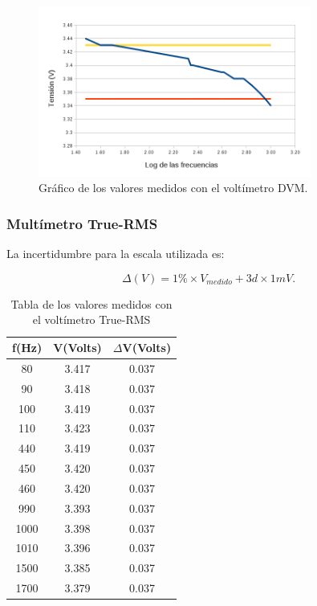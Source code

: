 \documentclass{article}
\begin{document}
\begin{figure}[!htb]
\centering
\includegraphics[width=0.80\textwidth]{images/tablaDVM.png}
\caption{Gráfico de los valores medidos con el voltímetro DVM.}
\end{figure}


\subsubsection{Multímetro True-RMS}

La incertidumbre para la escala utilizada es:

\begin{equation}
 	\Delta(V) = 1\%\times V_{medido} + 3d\times 1mV.
\end{equation}
\medskip


\bigskip
\begin{table}[h]
	\begin{center}
	\begin{tabular}{|c|c|c|}\hline
	\textbf{f(Hz)} & \textbf{V(Volts)} & \textbf{$\Delta$V(Volts)} \\ \hline
	80 & 3.417 & 0.037\\ \hline
    90 & 3.418 & 0.037\\ \hline
    100 & 3.419 & 0.037\\ \hline
	110 & 3.423 & 0.037\\ \hline
	440 & 3.419 & 0.037\\ \hline
	450 & 3.420 & 0.037\\ \hline
	460 & 3.420 & 0.037\\ \hline
	990 & 3.393 & 0.037\\ \hline
	1000 & 3.398 & 0.037\\ \hline
	1010& 3.396 & 0.037\\ \hline
	1500 & 3.385 & 0.037\\ \hline
	1700 & 3.379 & 0.037\\ \hline
	\end{tabular}
	\caption{Tabla de los valores medidos con el voltímetro True-RMS}
	\end{center}
\end{table}
\bigskip
\end{document}
